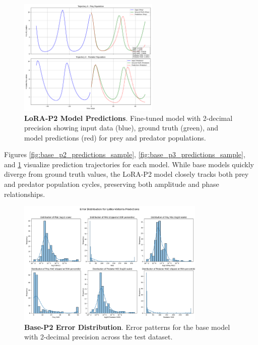 \documentclass{article}
\begin{document}
\begin{figure}[H]
    \centering
    \includegraphics[width=0.6\textwidth]{trajectory_0_prediction_final}
    \caption{\textbf{LoRA-P2 Model Predictions}. Fine-tuned model with 2-decimal precision showing input data (blue), ground truth (green), and model predictions (red) for prey and predator populations.}
    \label{fig:lora_p2_predictions_sample}
\end{figure}

Figures \ref{fig:base_p2_predictions_sample}, \ref{fig:base_p3_predictions_sample}, and \ref{fig:lora_p2_predictions_sample} visualize prediction trajectories for each model. While base models quickly diverge from ground truth values, the LoRA-P2 model closely tracks both prey and predator population cycles, preserving both amplitude and phase relationships. 

\begin{figure}[H]
    \centering
    \includegraphics[width=0.8\textwidth]{error_distributions_p2}
    \caption{\textbf{Base-P2 Error Distribution}. Error patterns for the base model with 2-decimal precision across the test dataset.}
    \label{fig:error_p2}
\end{figure}
\end{document}
